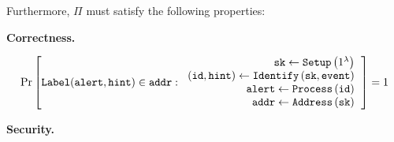 Furthermore, $\Pi$ must satisfy the following properties:

\textbf{Correctness.}

\[
  \textrm{Pr}\left[ 
    \mathtt{Label}(\mathtt{alert, hint}) \in \mathtt{addr} : 
    \begin{tabular}{r}
      $\mathtt{sk} \gets \mathtt{Setup}\left(1^\lambda\right)$\\
      $(\mathtt{id, hint}) \gets \mathtt{Identify}\left(\mathtt{sk, event}\right)$\\
      $\mathtt{alert} \gets \mathtt{Process}\left(\mathtt{id}\right)$\\
      $\mathtt{addr} \gets \mathtt{Address}\left(\mathtt{sk}\right)$\\
    \end{tabular} 
  \right] = 1
\]

\textbf{Security.}




